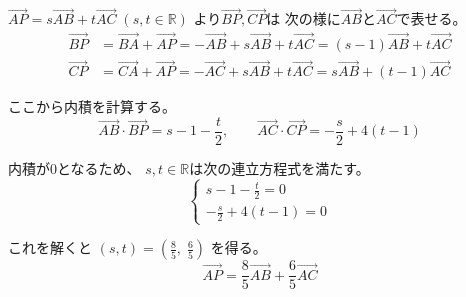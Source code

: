 \documentclass[12pt,b5paper]{ltjsarticle}
\begin{document}
\begin{enumerate}
      $\overrightarrow{AP} = s \overrightarrow{AB} + t \overrightarrow{AC}\;(s,t\in\mathbb{R})$
      より$\overrightarrow{BP},\overrightarrow{CP}$は
      次の様に$\overrightarrow{AB}$と$\overrightarrow{AC}$で表せる。
      \begin{align}
       \overrightarrow{BP}
        &= \overrightarrow{BA} + \overrightarrow{AP}
        = - \overrightarrow{AB} + s \overrightarrow{AB} + t \overrightarrow{AC}
        = (s-1) \overrightarrow{AB} + t \overrightarrow{AC}\\
       \overrightarrow{CP}
        &= \overrightarrow{CA} + \overrightarrow{AP}
        = - \overrightarrow{AC} + s \overrightarrow{AB} + t \overrightarrow{AC}
        = s \overrightarrow{AB} + (t-1) \overrightarrow{AC}
      \end{align}

      ここから内積を計算する。
      \begin{equation}
       \overrightarrow{AB} \cdot \overrightarrow{BP}
        = s-1 - \frac{t}{2}
        ,\qquad
       \overrightarrow{AC} \cdot \overrightarrow{CP}
        = -\frac{s}{2} +4(t-1)
      \end{equation}

      内積が0となるため、
      $s,t\in\mathbb{R}$は次の連立方程式を満たす。
      \begin{equation}
       \begin{cases}
        s-1 - \frac{t}{2} =0 \\
        -\frac{s}{2} +4(t-1) =0
       \end{cases}
      \end{equation}

      これを解くと
      $(s,t)=(\frac{8}{5},\;\frac{6}{5})$
      を得る。
      \begin{equation}
       \overrightarrow{AP} = \frac{8}{5} \overrightarrow{AB} + \frac{6}{5} \overrightarrow{AC}
      \end{equation}






\end{enumerate}
\end{document}
